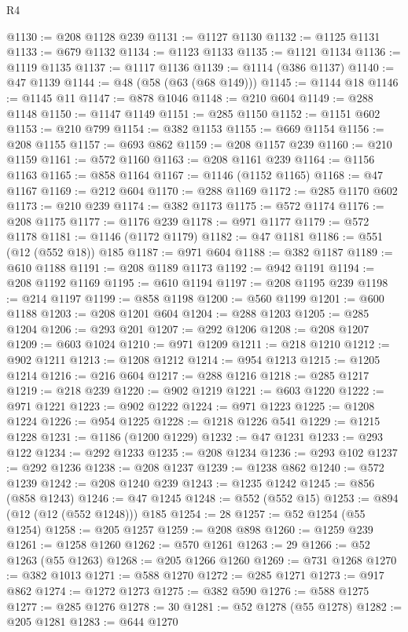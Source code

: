 \begin{lexlean}{R4}
\begin{coremodule}
@1130 := @208 @1128 @239
@1131 := @1127 @1130
@1132 := @1125 @1131
@1133 := @679 @1132
@1134 := @1123 @1133
@1135 := @1121 @1134
@1136 := @1119 @1135
@1137 := @1117 @1136
@1139 := @1114 (@386 @1137)
@1140 := @47 @1139
@1144 := @48 (@58 (@63 (@68 @149)))
@1145 := @1144 @18
@1146 := @1145 @11
@1147 := @878 @1046
@1148 := @210 @604
@1149 := @288 @1148
@1150 := @1147 @1149
@1151 := @285 @1150
@1152 := @1151 @602
@1153 := @210 @799
@1154 := @382 @1153
@1155 := @669 @1154
@1156 := @208 @1155
@1157 := @693 @862
@1159 := @208 @1157 @239
@1160 := @210 @1159
@1161 := @572 @1160
@1163 := @208 @1161 @239
@1164 := @1156 @1163
@1165 := @858 @1164
@1167 := @1146 (@1152 @1165)
@1168 := @47 @1167
@1169 := @212 @604
@1170 := @288 @1169
@1172 := @285 @1170 @602
@1173 := @210 @239
@1174 := @382 @1173
@1175 := @572 @1174
@1176 := @208 @1175
@1177 := @1176 @239
@1178 := @971 @1177
@1179 := @572 @1178
@1181 := @1146 (@1172 @1179)
@1182 := @47 @1181
@1186 := @551 (@12 (@552 @18)) @185
@1187 := @971 @604
@1188 := @382 @1187
@1189 := @610 @1188
@1191 := @208 @1189 @1173
@1192 := @942 @1191
@1194 := @208 @1192 @1169
@1195 := @610 @1194
@1197 := @208 @1195 @239
@1198 := @214 @1197
@1199 := @858 @1198
@1200 := @560 @1199
@1201 := @600 @1188
@1203 := @208 @1201 @604
@1204 := @288 @1203
@1205 := @285 @1204
@1206 := @293 @201
@1207 := @292 @1206
@1208 := @208 @1207
@1209 := @603 @1024
@1210 := @971 @1209
@1211 := @218 @1210
@1212 := @902 @1211
@1213 := @1208 @1212
@1214 := @954 @1213
@1215 := @1205 @1214
@1216 := @216 @604
@1217 := @288 @1216
@1218 := @285 @1217
@1219 := @218 @239
@1220 := @902 @1219
@1221 := @603 @1220
@1222 := @971 @1221
@1223 := @902 @1222
@1224 := @971 @1223
@1225 := @1208 @1224
@1226 := @954 @1225
@1228 := @1218 @1226 @541
@1229 := @1215 @1228
@1231 := @1186 (@1200 @1229)
@1232 := @47 @1231
@1233 := @293 @122
@1234 := @292 @1233
@1235 := @208 @1234
@1236 := @293 @102
@1237 := @292 @1236
@1238 := @208 @1237
@1239 := @1238 @862
@1240 := @572 @1239
@1242 := @208 @1240 @239
@1243 := @1235 @1242
@1245 := @856 (@858 @1243)
@1246 := @47 @1245
@1248 := @552 (@552 @15)
@1253 := @894 (@12 (@12 (@552 @1248))) @185
@1254 := 28
@1257 := @52 @1254 (@55 @1254)
@1258 := @205 @1257
@1259 := @208 @898
@1260 := @1259 @239
@1261 := @1258 @1260
@1262 := @570 @1261
@1263 := 29
@1266 := @52 @1263 (@55 @1263)
@1268 := @205 @1266 @1260
@1269 := @731 @1268
@1270 := @382 @1013
@1271 := @588 @1270
@1272 := @285 @1271
@1273 := @917 @862
@1274 := @1272 @1273
@1275 := @382 @590
@1276 := @588 @1275
@1277 := @285 @1276
@1278 := 30
@1281 := @52 @1278 (@55 @1278)
@1282 := @205 @1281
@1283 := @644 @1270

\end{coremodule}
\end{lexlean}
